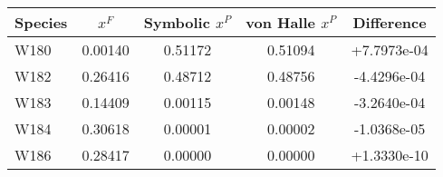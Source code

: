 \begin{tabular}{|l||c||c|c|c|}
\hline
\bf{Species} & \bf{$x^F$} & \bf{Symbolic $x^P$} & \bf{von Halle $x^P$} & \bf{Difference} \\ 
\hline
W180 & 0.00140 & 0.51172 & 0.51094 & +7.7973e-04 \\ 
\hline
W182 & 0.26416 & 0.48712 & 0.48756 & -4.4296e-04 \\ 
\hline
W183 & 0.14409 & 0.00115 & 0.00148 & -3.2640e-04 \\ 
\hline
W184 & 0.30618 & 0.00001 & 0.00002 & -1.0368e-05 \\ 
\hline
W186 & 0.28417 & 0.00000 & 0.00000 & +1.3330e-10 \\ 
\hline
\end{tabular}
